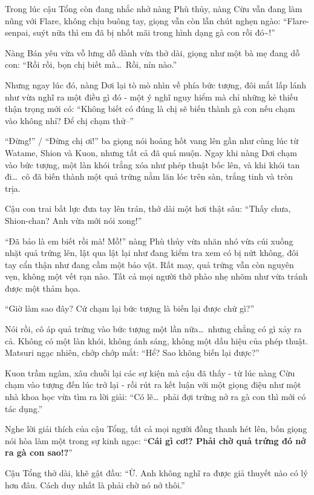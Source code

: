 \documentclass[../main.tex]{subfiles}
\begin{document}
Trong lúc cậu Tổng còn đang nhắc nhở nàng Phù thủy, nàng Cừu vẫn đang làm nũng với Flare, không chịu buông tay, giọng vẫn còn lẫn chút nghẹn ngào: ``Flare-senpai, suýt nữa thì em đã bị nhốt mãi trong hình dạng gà con rồi đó\~{}!''

Nàng Bán yêu vừa vỗ lưng dỗ dành vừa thở dài, giọng như một bà mẹ đang dỗ con: ``Rồi rồi, bọn chị biết mà\dots\ Rồi, nín nào.''

Nhưng ngay lúc đó, nàng Dơi lại tò mò nhìn về phía bức tượng, đôi mắt lấp lánh như vừa nghĩ ra một điều gì đó - một ý nghĩ nguy hiểm mà chỉ những kẻ thiếu thận trọng mới có: ``Không biết có đúng là chị sẽ biến thành gà con nếu chạm vào không nhỉ? Để chị chạm thử--''

``Đừng!'' / ``Đừng chị ơi!'' ba giọng nói hoảng hốt vang lên gần như cùng lúc từ Watame, Shion và Kuon, nhưng tất cả đã quá muộn. Ngay khi nàng Dơi chạm vào bức tượng, một làn khói trắng xóa như phép thuật bốc lên, và khi khói tan đi\dots\ cô đã biến thành một quả trứng nằm lăn lóc trên sàn, trắng tinh và tròn trịa.

Cậu con trai bất lực đưa tay lên trán, thở dài một hơi thật sâu: ``Thấy chưa, Shion-chan? Anh vừa mới nói xong!''

``Đã bảo là em biết rồi mà! Mồ!'' nàng Phù thủy vừa nhăn nhó vừa cúi xuống nhặt quả trứng lên, lật qua lật lại như đang kiểm tra xem có bị nứt không, đôi tay cẩn thận như đang cầm một bảo vật. Rất may, quả trứng vẫn còn nguyên vẹn, không một vết rạn nào. Tất cả mọi người thở phào nhẹ nhõm như vừa tránh được một thảm họa.

``Giờ làm sao đây? Cứ chạm lại bức tượng là biến lại được chứ gì?''

Nói rồi, cô áp quả trứng vào bức tượng một lần nữa\dots\ nhưng chẳng có gì xảy ra cả. Không có một làn khói, không ánh sáng, không một dấu hiệu của phép thuật. Matsuri ngạc nhiên, chớp chớp mắt: ``Hể? Sao không biến lại được?''

Kuon trầm ngâm, xâu chuỗi lại các sự kiện mà cậu đã thấy - từ lúc nàng Cừu chạm vào tượng đến lúc trở lại - rồi rút ra kết luận với một giọng điệu như một nhà khoa học vừa tìm ra lời giải: ``Có lẽ\dots\ phải đợi trứng nở ra gà con thì mới có tác dụng.''

Nghe lời giải thích của cậu Tổng, tất cả mọi người đồng thanh hét lên, bốn giọng nói hòa làm một trong sự kinh ngạc: ``\textbf{Cái gì cơ!? Phải chờ quả trứng đó nở ra gà con sao!?}''

Cậu Tổng thở dài, khẽ gật đầu: ``Ừ. Anh không nghĩ ra được giả thuyết nào có lý hơn đâu. Cách duy nhất là phải chờ nó nở thôi.''
\end{document}
